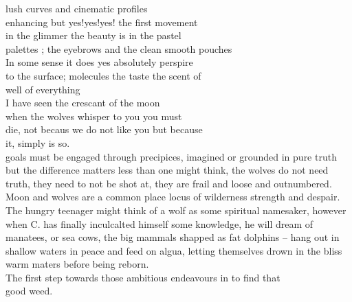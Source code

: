 lush curves and cinematic profiles\\
enhancing but yes!yes!yes! the first movement\\
in the glimmer the beauty is in the pastel\\
palettes ; the eyebrows and the clean smooth pouches\\
In some sense it does yes absolutely perspire\\
to the surface; molecules the taste the scent of \\
well of everything \\
I have seen the crescant of the moon\\
when the wolves whisper to you you must\\
die, not becaus we do not like you but because\\
it, simply is so.\\
goals must be engaged through precipices, imagined or grounded in pure truth but the difference
matters less than one might think, the wolves do not need truth, they need to not 
be shot at, they are frail and loose and outnumbered. Moon and wolves are 
a common place locus of wilderness strength and despair. The hungry teenager
might think of a wolf as some spiritual namesaker, however when  C. 
has finally inculcalted himself some knowledge, he will dream of manatees, or 
sea cows, the big mammals shapped as fat dolphins -- hang out in shallow
waters in peace and feed on algua, letting themselves drown in the bliss
warm maters before being reborn.\\
The first step towards those ambitious endeavours in to find that\\
\phantom{ } \hspace{1cm}good weed.

\newpage
\justify
 \renewcommand{\familydefault}{\sfdefault}

\begin{comment}
\centering
I have committed, \\
the only crimes that befit me\\
i can only make sense of it through coherence,\\
some blinking skeleton of structure\\
this is what I've been trying at \\
to tell you in this letter.\\

My life without you is steps on glass.\\

	Sincerely Yours,\\
Your Dutchess

I have seen snowy mountains drunken half dead\\
paraplegic lost veterans stricken by PTSD\\
out of a single Foo Fighter song, shitting\\
through their last long johns crying\\
crying some blues they wish meant something\\
\end{comment}
